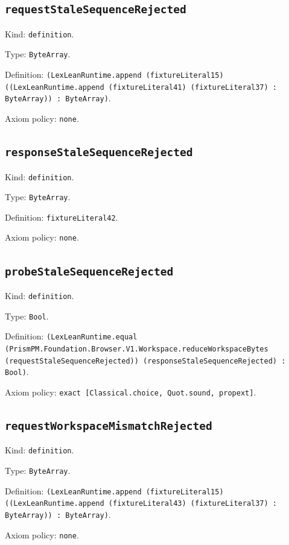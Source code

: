\documentclass[11pt]{article}
\begin{document}
\subsection*{\texttt{requestStaleSequenceRejected}}
\noindent Kind: \texttt{definition}.\par
\noindent Type: \texttt{ByteArray}.\par
\noindent Definition: \texttt{(LexLeanRuntime.append (fixtureLiteral15) ((LexLeanRuntime.append (fixtureLiteral41) (fixtureLiteral37) : ByteArray)) : ByteArray)}.\par
\noindent Axiom policy: \texttt{none}.\par
\subsection*{\texttt{responseStaleSequenceRejected}}
\noindent Kind: \texttt{definition}.\par
\noindent Type: \texttt{ByteArray}.\par
\noindent Definition: \texttt{fixtureLiteral42}.\par
\noindent Axiom policy: \texttt{none}.\par
\subsection*{\texttt{probeStaleSequenceRejected}}
\noindent Kind: \texttt{definition}.\par
\noindent Type: \texttt{Bool}.\par
\noindent Definition: \texttt{(LexLeanRuntime.equal (PrismPM.Foundation.Browser.V1.Workspace.reduceWorkspaceBytes (requestStaleSequenceRejected)) (responseStaleSequenceRejected) : Bool)}.\par
\noindent Axiom policy: \texttt{exact [Classical.choice, Quot.sound, propext]}.\par
\subsection*{\texttt{requestWorkspaceMismatchRejected}}
\noindent Kind: \texttt{definition}.\par
\noindent Type: \texttt{ByteArray}.\par
\noindent Definition: \texttt{(LexLeanRuntime.append (fixtureLiteral15) ((LexLeanRuntime.append (fixtureLiteral43) (fixtureLiteral37) : ByteArray)) : ByteArray)}.\par
\noindent Axiom policy: \texttt{none}.\par
\end{document}
